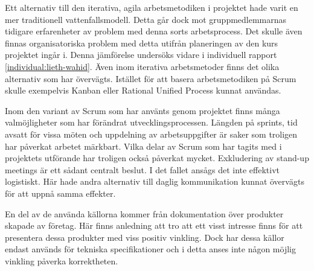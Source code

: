 Ett alternativ till den iterativa, agila arbetsmetodiken i projektet hade varit en mer traditionell vattenfallsmodell. Detta går dock mot gruppmedlemmarnas tidigare erfarenheter av problem med denna sorts arbetsprocess. Det skulle även finnas organisatoriska problem med detta utifrån planeringen av den kurs projektet ingår i. Denna jämförelse undersöks vidare i individuell rapport \ref{individual:lieth-wahid}. Även inom iterativa arbetsmetoder finns det olika alternativ som har övervägts. Istället för att basera arbetsmetodiken på Scrum skulle exempelvis Kanban\cite{kanban} eller Rational Unified Process\cite{RUP} kunnat användas.

Inom den variant av Scrum som har använts genom projektet finns många valmöjligheter som har förändrat utvecklingsprocessen. Längden på sprints, tid avsatt för vissa möten och uppdelning av arbetsuppgifter är saker som troligen har påverkat arbetet märkbart. Vilka delar av Scrum som har tagits med i projektets utförande har troligen också påverkat mycket. Exkludering av stand-up meetings är ett sådant centralt beslut. I det fallet ansågs det inte effektivt logistiskt. Här hade andra alternativ till daglig kommunikation kunnat övervägts för att uppnå samma effekter.

En del av de använda källorna kommer från dokumentation över produkter skapade av företag. Här finns anledning att tro att ett visst intresse finns för att presentera dessa produkter med viss positiv vinkling. Dock har dessa källor endast används för tekniska specifikationer och i detta anses inte någon möjlig vinkling påverka korrektheten.


